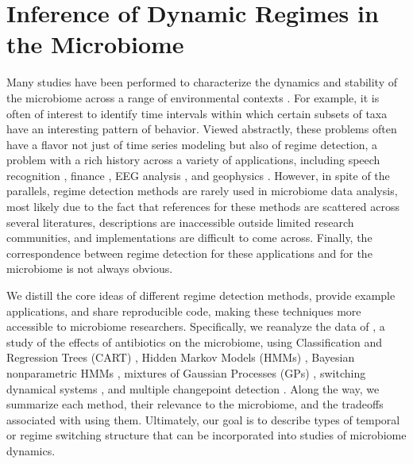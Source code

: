 \chapter{Inference of Dynamic Regimes in the Microbiome}
\label{ch:dynamic_regimes}

Many studies have been performed to characterize the dynamics and stability of
the microbiome across a range of environmental contexts
\citep{costello2012application, stein2013ecological, faust2015metagenomics}. For
example, it is often of interest to identify time intervals within which certain
subsets of taxa have an interesting pattern of behavior. Viewed abstractly,
these problems often have a flavor not just of time series modeling but also of
regime detection, a problem with a rich history across a variety of
applications, including speech recognition \citep{fox2011sticky}, finance
\citep{lee2009optimal}, EEG analysis \citep{camilleri2014automatic}, and
geophysics \citep{weatherley2002relationship}. However, in spite of the
parallels, regime detection methods are rarely used in microbiome data analysis,
most likely due to the fact that references for these methods are scattered
across several literatures, descriptions are inaccessible outside limited
research communities, and implementations are difficult to come across. Finally,
the correspondence between regime detection for these applications and for the
microbiome is not always obvious.

We distill the core ideas of different regime detection methods, provide example
applications, and share reproducible code, making these techniques more
accessible to microbiome researchers. Specifically, we reanalyze the data of
\cite{dethlefsen2011incomplete}, a study of the effects of antibiotics on the
microbiome, using Classification and Regression Trees (CART)
\citep{breiman1984classification}, Hidden Markov Models (HMMs)
\citep{rabiner1986introduction}, Bayesian nonparametric HMMs
\citep{teh2010hierarchical, fox2008hdp}, mixtures of Gaussian Processes (GPs)
\citep{rasmussen2002infinite}, switching dynamical systems
\citep{linderman2016recurrent}, and multiple changepoint detection
\citep{fan2015empirical}. Along the way, we summarize each method, their
relevance to the microbiome, and the tradeoffs associated with using them.
Ultimately, our goal is to describe types of temporal or regime switching
structure that can be incorporated into studies of microbiome dynamics.

